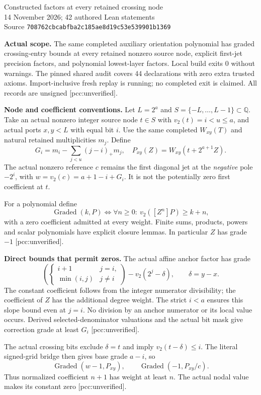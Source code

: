 \documentclass[10pt]{article}
\begin{document}
\begin{center}
{\Large Constructed factors at every retained crossing node}\\[4pt]
14 November 2026; 42 authored Lean statements\\
Source \texttt{708762cbcabfba2c185ae8d19c53e539901b1369}
\end{center}
\textbf{Actual scope.} The same completed auxiliary orientation polynomial
has graded crossing-entry bounds at every retained nonzero source node,
explicit first-jet precision factors, and polynomial lowest-layer factors.
Local build exits 0 without warnings. The pinned shared audit covers 44 declarations with zero extra trusted
axioms. Import-inclusive fresh replay is running; no completed exit is claimed. All records are unsigned
[pcc:unverified].

\textbf{Node and coefficient conventions.} Let $L=2^a$ and
$S=\{-L,\ldots,L-1\}\subset\mathbb Q$. Take an actual nonzero integer
source node $t\in S$ with $v_2(t)=i<u\le a$, and actual ports $x,y<L$
with equal bit $i$. Use the same completed $W_{xy}(T)$ and natural retained
multiplicities $m_j$. Define
\[
 G_i=m_i-\sum_{j<u}(j-i)_+m_j,\quad
 P_{xy}(Z)=W_{xy}(t+2^{a+1}Z).
\]
The actual nonzero reference $c$ remains the first diagonal jet at the
\emph{negative} pole $-2^i$, with $w=v_2(c)=a+1-i+G_i$.
It is not the potentially zero first coefficient at $t$.

For a polynomial define
\[
 \operatorname{Graded}(k,P)\iff
 \forall n\ge0:\ v_2([Z^n]P)\ge k+n,
\]
with a zero coefficient admitted at every weight. Finite sums, products,
powers and scalar polynomials have explicit closure lemmas. In particular
$Z$ has grade $-1$ [pcc:unverified].

\textbf{Direct bounds that permit zeros.} The actual affine anchor factor
has grade
\[
 \left(\begin{cases}i+1&j=i,\\\min(i,j)&j\ne i\end{cases}\right)
 -v_2(2^j-\delta),\qquad\delta=y-x.
\]
The constant coefficient follows from the integer numerator divisibility;
the coefficient of $Z$ has the additional degree weight. The strict $i<a$
ensures this slope bound even at $j=i$. No division by an anchor numerator
or its local value occurs. Derived selected-denominator valuations and the
actual bit mask give correction grade at least $G_i$ [pcc:unverified].

The actual crossing bits exclude $\delta=t$ and imply
$v_2(t-\delta)\le i$. The literal signed-grid bridge then gives base grade
$a-i$, so
\[
 \operatorname{Graded}(w-1,P_{xy}),\qquad
 \operatorname{Graded}(-1,P_{xy}/c).
\]
Thus normalized coefficient $n+1$ has weight at least $n$. The actual nodal
value makes its constant zero [pcc:unverified].
\end{document}
